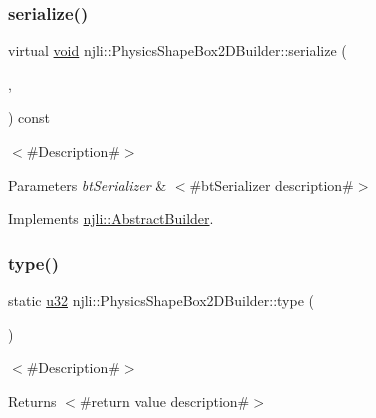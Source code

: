 \subsubsection{\texorpdfstring{serialize()}{serialize()}}
{\footnotesize\ttfamily virtual \mbox{\hyperlink{_thread_8h_af1e856da2e658414cb2456cb6f7ebc66}{void}} njli\+::\+Physics\+Shape\+Box2\+D\+Builder\+::serialize (\begin{DoxyParamCaption}\item[{\mbox{\hyperlink{_thread_8h_af1e856da2e658414cb2456cb6f7ebc66}{void}} $\ast$}]{,  }\item[{bt\+Serializer $\ast$}]{ }\end{DoxyParamCaption}) const\hspace{0.3cm}{\ttfamily [virtual]}}

$<$\#\+Description\#$>$


\begin{DoxyParams}{Parameters}
{\em bt\+Serializer} & $<$\#bt\+Serializer description\#$>$ \\
\hline
\end{DoxyParams}


Implements \mbox{\hyperlink{classnjli_1_1_abstract_builder_ab66b774e02ccb9da554c9aab7fa6d981}{njli\+::\+Abstract\+Builder}}.

\mbox{\label{classnjli_1_1_physics_shape_box2_d_builder_aa96bb4f668a8ae62c5d67011dbfd3ec2}} 
\subsubsection{\texorpdfstring{type()}{type()}}
{\footnotesize\ttfamily static \mbox{\hyperlink{_util_8h_a10e94b422ef0c20dcdec20d31a1f5049}{u32}} njli\+::\+Physics\+Shape\+Box2\+D\+Builder\+::type (\begin{DoxyParamCaption}{ }\end{DoxyParamCaption})\hspace{0.3cm}{\ttfamily [static]}}

$<$\#\+Description\#$>$

\begin{DoxyReturn}{Returns}
$<$\#return value description\#$>$ 
\end{DoxyReturn}



